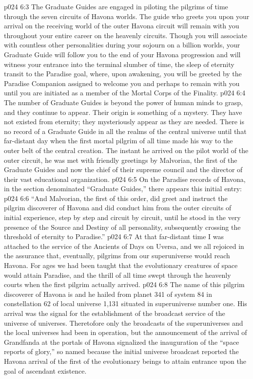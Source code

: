 \vs p024 6:3 The Graduate Guides are engaged in piloting the pilgrims of time through the seven circuits of Havona worlds. The guide who greets you upon your arrival on the receiving world of the outer Havona circuit will remain with you throughout your entire career on the heavenly circuits. Though you will associate with countless other personalities during your sojourn on a billion worlds, your Graduate Guide will follow you to the end of your Havona progression and will witness your entrance into the terminal slumber of time, the sleep of eternity transit to the Paradise goal, where, upon awakening, you will be greeted by the Paradise Companion assigned to welcome you and perhaps to remain with you until you are initiated as a member of the Mortal Corps of the Finality.
\vs p024 6:4 \pc The number of Graduate Guides is beyond the power of human minds to grasp, and they continue to appear. Their origin is something of a mystery. They have not existed from eternity; they mysteriously appear as they are needed. There is no record of a Graduate Guide in all the realms of the central universe until that far\hyp{}distant day when the first mortal pilgrim of all time made his way to the outer belt of the central creation. The instant he arrived on the pilot world of the outer circuit, he was met with friendly greetings by Malvorian, the first of the Graduate Guides and now the chief of their supreme council and the director of their vast educational organization.
\vs p024 6:5 On the Paradise records of Havona, in the section denominated “Graduate Guides,” there appears this initial entry:
\vs p024 6:6 “And Malvorian, the first of this order, did greet and instruct the pilgrim discoverer of Havona and did conduct him from the outer circuits of initial experience, step by step and circuit by circuit, until he stood in the very presence of the Source and Destiny of all personality, subsequently crossing the threshold of eternity to Paradise.”
\vs p024 6:7 At that far\hyp{}distant time I was attached to the service of the Ancients of Days on Uversa, and we all rejoiced in the assurance that, eventually, pilgrims from our superuniverse would reach Havona. For ages we had been taught that the evolutionary creatures of space would attain Paradise, and the thrill of all time swept through the heavenly courts when the first pilgrim actually arrived.
\vs p024 6:8 \pc The name of this pilgrim discoverer of Havona is  and he hailed from planet 341 of system 84 in constellation 62 of local universe 1,131 situated in superuniverse number one. His arrival was the signal for the establishment of the broadcast service of the universe of universes. Theretofore only the broadcasts of the superuniverses and the local universes had been in operation, but the announcement of the arrival of Grandfanda at the portals of Havona signalized the inauguration of the “space reports of glory,” so named because the initial universe broadcast reported the Havona arrival of the first of the evolutionary beings to attain entrance upon the goal of ascendant existence.
